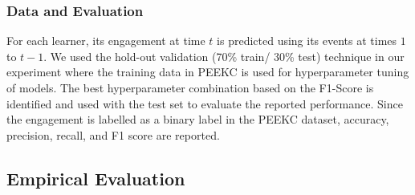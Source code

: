 \documentclass[letterpaper]{article} %
\begin{document}
\subsubsection{Data and Evaluation} For each learner, its engagement at time $t$ is predicted using its events at times $1$ to $t-1$. We used the hold-out validation (70\% train/ 30\% test) technique in our experiment where the training data in PEEKC is used for hyperparameter tuning of models. The best hyperparameter combination based on the F1-Score is identified and used with the test set to evaluate the reported performance. Since the engagement is labelled as a binary label in the PEEKC dataset, accuracy, precision, recall, and F1 score are reported.


\subsection{Empirical Evaluation}
\end{document}
